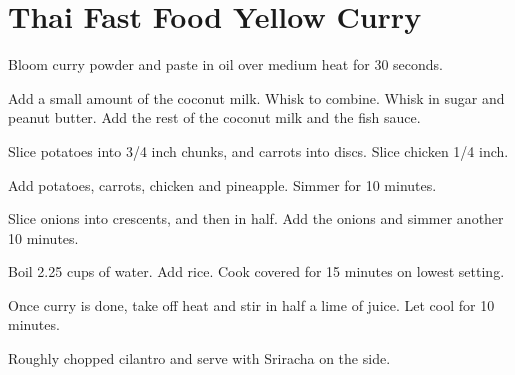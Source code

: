 \section{Thai Fast Food Yellow Curry}
\begin{recipe}


        
Bloom curry powder and paste  in oil over medium heat for 30 seconds. 

Add a small amount of the coconut milk. Whisk to combine. Whisk in sugar and peanut butter. 
Add the rest of the coconut milk and the fish sauce. 


Slice potatoes into 3/4 inch chunks, and carrots into discs. Slice chicken 1/4 inch. 

Add potatoes, carrots, chicken and pineapple. Simmer for 10 minutes. 

Slice onions into crescents, and then in half. Add the onions and simmer another 10 minutes. 


Boil 2.25 cups of water. Add rice. Cook covered for 15 minutes on lowest setting. 


Once curry is done, take off heat and stir in half a lime of juice. Let cool for 10 minutes. 

Roughly chopped cilantro and serve with Sriracha on the side. 

\end{recipe}
